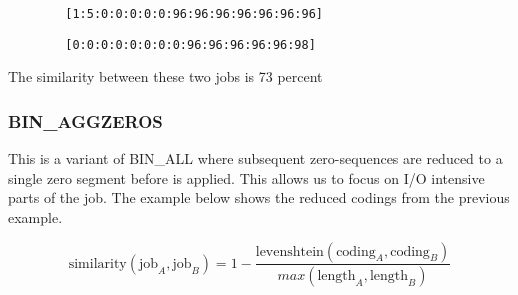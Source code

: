 \documentclass{jhps}
\begin{document}
\begin{listing}
	\noindent\begin{minipage}{0.50\textwidth}
		\begin{lstlisting}
		[1:5:0:0:0:0:0:96:96:96:96:96:96:96]
		\end{lstlisting}
		\vspace{-2em}
		\label{lst:test:a}
	\end{minipage}
	\hfill
	\noindent\begin{minipage}{0.50\textwidth}
		\begin{lstlisting}
		[0:0:0:0:0:0:0:0:96:96:96:96:96:98]
		\end{lstlisting}
		\vspace{-2em}
		\label{lst:test:b}
	\end{minipage}
	\caption{The similarity between these two jobs is 73 percent}
	\label{lst:test}
\end{listing}


\subsubsection{BIN\_AGGZEROS}
This is a variant of BIN\_ALL where subsequent zero-sequences are reduced to a single zero segment before  is applied.
This allows us to focus on I/O intensive parts of the job.
The example below shows the reduced codings from the previous example.

\begin{equation}
	\text{similarity} \left(\text{job}_{A},\text{job}_{B} \right) =1- \frac{\text{levenshtein} \left(\text{coding}_{A},\text{coding}_{B} \right) }{max \left(\text{length}_{A},\text{length}_{B} \right) } \label{eq:sim:bin_aggzeros}
\end{equation}

\end{document}
